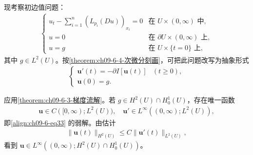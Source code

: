 \documentclass[../../main.tex]{subfiles}
\begin{document}
现考察初边值问题：
\begin{align}
\begin{cases}
u_t-\sum_{i=1}^n(L_{p_i}(Du))_{x_i}=0&\text{在 }U\times(0,\infty)\text{ 中},\\
u=0&\text{在 }\partial U\times(0,\infty)\text{ 上},\\
u=g&\text{在 }U\times\{t=0\}\text{ 上},
\end{cases}\label{align:ch09-6-eq33}
\end{align}
其中 $g\in L^2(U)$。按\cref{theorem:ch09-6-4-次微分刻画}，可把此问题改写为抽象形式
\begin{align}
\begin{cases}
\mathbf{u}'(t)=-\partial I[\mathbf{u}(t)]&(t\geqslant 0),\\
\mathbf{u}(0)=g.
\end{cases}\label{align:ch09-6-eq34}
\end{align}

应用\cref{theorem:ch09-6-3-梯度流解}。若 $g\in H^2(U)\cap H_0^1(U)$，存在唯一函数
\begin{align*}
\mathbf{u}\in C([0,\infty);L^2(U)),\quad \mathbf{u}'\in L^\infty((0,\infty);L^2(U)),
\end{align*}
即\eqref{align:ch09-6-eq33} 的弱解。由估计
\begin{align*}
\|\mathbf{u}(t)\|_{H^2(U)}\leqslant C\|\mathbf{u}'(t)\|_{L^2(U)},
\end{align*}
看到 $\mathbf{u}\in L^\infty((0,\infty);H^2(U)\cap H_0^1(U))$。
\end{document}
